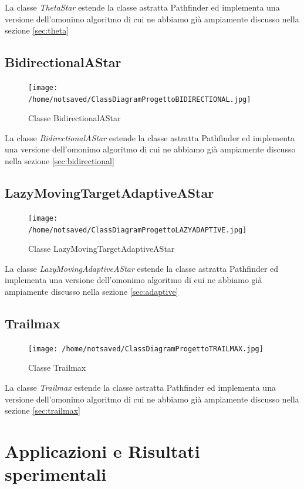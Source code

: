\documentclass[11pt]{book}
\begin{document}
La classe \emph{ThetaStar} estende la classe astratta Pathfinder ed implementa una versione dell'omonimo algoritmo di cui ne abbiamo gi\`a ampiamente discusso nella sezione \ref{sec:theta}

\section{BidirectionalAStar}

\begin{figure}[H]
\centering
\texttt{[image: /home/notsaved/ClassDiagramProgettoBIDIRECTIONAL.jpg]}
\caption{Classe BidirectionalAStar}
\label{classbidirectional}
\end{figure}

La classe \emph{BidirectionalAStar} estende la classe astratta Pathfinder ed implementa una versione dell'omonimo algoritmo di cui ne abbiamo gi\`a ampiamente discusso nella sezione \ref{sec:bidirectional}

\section{LazyMovingTargetAdaptiveAStar}
\begin{figure}[H]
\centering
\texttt{[image: /home/notsaved/ClassDiagramProgettoLAZYADAPTIVE.jpg]}
\caption{Classe LazyMovingTargetAdaptiveAStar}
\label{classlazyadaptive}
\end{figure}



La classe \emph{LazyMovingAdaptiveAStar} estende la classe astratta Pathfinder ed implementa una versione dell'omonimo algoritmo di cui ne abbiamo gi\`a ampiamente discusso nella sezione \ref{sec:adaptive}

\section{Trailmax}

\begin{figure}[H]
\centering
\texttt{[image: /home/notsaved/ClassDiagramProgettoTRAILMAX.jpg]}
\caption{Classe Trailmax}
\label{classtrailmax}
\end{figure}

La classe \emph{Trailmax} estende la classe astratta Pathfinder ed implementa una versione dell'omonimo algoritmo di cui ne abbiamo gi\`a ampiamente discusso nella sezione \ref{sec:trailmax}

\chapter{Applicazioni e Risultati sperimentali}
\end{document}
